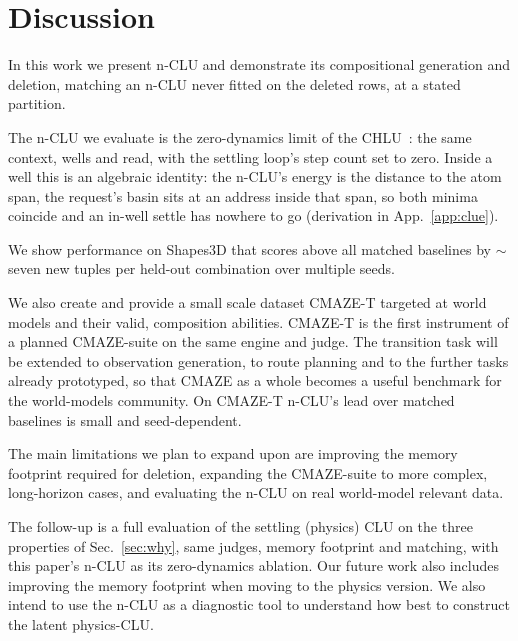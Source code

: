 \documentclass{article} %
\begin{document}
\section{Discussion}
\label{sec:limits}

In this work we present n-CLU and demonstrate its compositional generation and deletion, matching an n-CLU never fitted on the deleted rows, at a stated partition.

The n-CLU we evaluate is the zero-dynamics limit of the CHLU~\citep{jawahar2026chlu}: the same context, wells and read, with the settling loop's step count set to zero. Inside a well this is an
algebraic identity: the n-CLU's energy is the distance to the atom span, the request's basin sits
at an address inside that span, so both minima coincide and an in-well settle has nowhere to go
(derivation in App.~\ref{app:clue}).

We show performance on
Shapes3D that scores above all matched baselines by $\sim$seven new tuples per held-out combination over multiple seeds. 

We also create and provide a small scale dataset CMAZE-T targeted at world models and their valid, composition abilities. CMAZE-T is the first instrument of a planned CMAZE-suite on the same
engine and judge. The transition task will be extended to observation generation, to route planning and to the further tasks already prototyped, so that CMAZE as a whole becomes a useful benchmark for
the world-models community. On CMAZE-T n-CLU's lead over matched
baselines is small and seed-dependent. 

The main limitations we plan to expand upon are improving the memory footprint required for deletion, expanding the CMAZE-suite to more complex, long-horizon cases, and evaluating the n-CLU on real world-model relevant data. 

The follow-up is a full evaluation of the settling (physics) CLU on the three properties of
Sec.~\ref{sec:why}, same judges, memory footprint and matching, with this paper's n-CLU as its zero-dynamics
ablation. Our future work also includes improving the memory footprint when moving to the physics version. We also intend to use the n-CLU as a diagnostic tool to understand how best to construct the latent physics-CLU.


\end{document}
